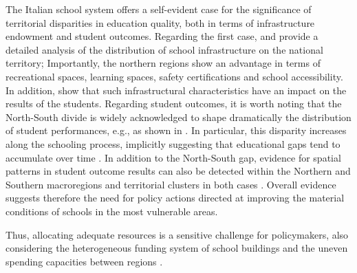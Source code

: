 \documentclass{article}%
\begin{document}
The Italian school system offers a self-evident case for the significance of territorial disparities in education quality, both in terms of infrastructure endowment and student outcomes. Regarding the first case,  \cite{Garlaschi} and \cite{BDI} provide a detailed analysis of the distribution of school infrastructure on the national territory; Importantly, the northern regions show an advantage in terms of recreational spaces, learning spaces, safety certifications and school accessibility. In addition, \cite{BDI} show that such infrastructural characteristics have an impact on the results of the students. Regarding student outcomes, it is worth noting that the North-South divide is widely acknowledged to shape dramatically the distribution of student performances, e.g., as shown in \cite{Agasisti}. In particular, this disparity increases along the schooling process, implicitly suggesting that educational gaps tend to accumulate over time \citep{Invalsi2020}. In addition to the North-South gap,  evidence for spatial patterns in student outcome results can also be detected within the Northern and Southern macroregions and territorial clusters in both cases \citep[][respectively]{bag:do:north, do:bag:mar:south}. Overall evidence suggests therefore the need for policy actions directed at improving the material conditions of schools in the most vulnerable areas.

Thus, allocating adequate resources is a sensitive challenge for policymakers, also considering the heterogeneous funding system of school buildings and the uneven spending capacities between regions \citep[as in the case of Northern special statute regions, see][]{BDI}.
\end{document}
